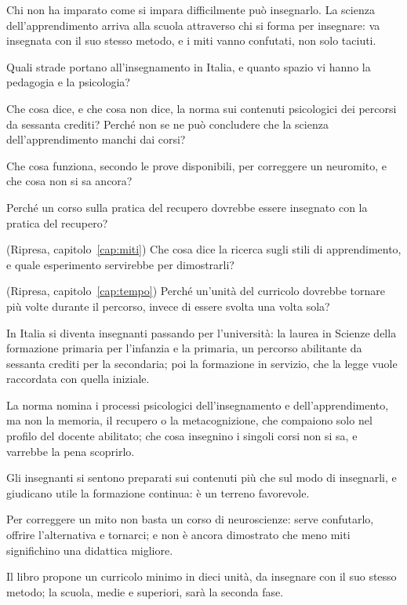 \begin{daricordare}
Chi non ha imparato come si impara difficilmente può insegnarlo. La
scienza dell'apprendimento arriva alla scuola attraverso chi si forma
per insegnare: va insegnata con il suo stesso metodo, e i miti vanno
confutati, non solo taciuti.
\end{daricordare}

\begin{domande}
  \item Quali strade portano all'insegnamento in Italia, e quanto
        spazio vi hanno la pedagogia e la psicologia?
  \item Che cosa dice, e che cosa non dice, la norma sui contenuti
        psicologici dei percorsi da sessanta crediti? Perché non se ne
        può concludere che la scienza dell'apprendimento manchi dai
        corsi?
  \item Che cosa funziona, secondo le prove disponibili, per correggere
        un neuromito, e che cosa non si sa ancora?
  \item Perché un corso sulla pratica del recupero dovrebbe essere
        insegnato con la pratica del recupero?
  \item (Ripresa, capitolo~\ref{cap:miti}) Che cosa dice la ricerca
        sugli stili di apprendimento, e quale esperimento servirebbe
        per dimostrarli?
  \item (Ripresa, capitolo~\ref{cap:tempo}) Perché un'unità del
        curricolo dovrebbe tornare più volte durante il percorso,
        invece di essere svolta una volta sola?
\end{domande}

\begin{sintesi}
  \item In Italia si diventa insegnanti passando per l'università: la
        laurea in Scienze della formazione primaria per l'infanzia e
        la primaria, un percorso abilitante da sessanta crediti per la
        secondaria; poi la formazione in servizio, che la legge vuole
        raccordata con quella iniziale.
  \item La norma nomina i processi psicologici dell'insegnamento e
        dell'apprendimento, ma non la memoria, il recupero o la
        metacognizione, che compaiono solo nel profilo del docente
        abilitato; che cosa insegnino i singoli corsi non si sa, e
        varrebbe la pena scoprirlo.
  \item Gli insegnanti si sentono preparati sui contenuti più che sul
        modo di insegnarli, e giudicano utile la formazione continua:
        è un terreno favorevole.
  \item Per correggere un mito non basta un corso di neuroscienze:
        serve confutarlo, offrire l'alternativa e tornarci; e non è
        ancora dimostrato che meno miti significhino una didattica
        migliore.
  \item Il libro propone un curricolo minimo in dieci unità, da
        insegnare con il suo stesso metodo; la scuola, medie e
        superiori, sarà la seconda fase.
\end{sintesi}

\finecapitolo
